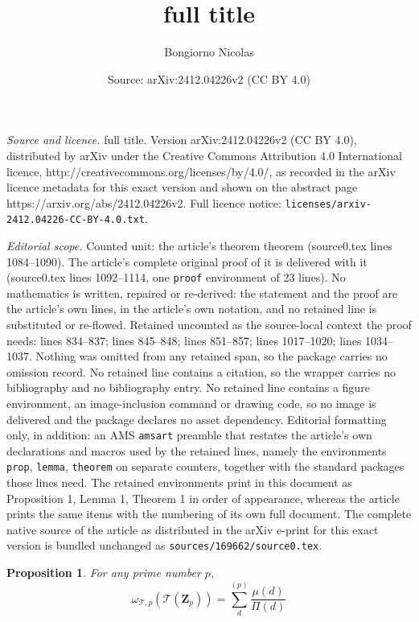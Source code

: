 \documentclass[10pt,a4paper]{amsart}
\title{full title}
\author{Bongiorno Nicolas}
\date{Source: arXiv:2412.04226v2 (CC BY 4.0)}
\newtheorem{prop}{Proposition}
\newcommand{\Z}{\mathbf{Z}}
\newcommand{\stackT}{\mathcal{T}}
\newcommand{\w}{\omega}
\begin{document}
\maketitle

\noindent\emph{Source and licence.} full title. Version arXiv:2412.04226v2 (CC BY 4.0), distributed by arXiv under the Creative Commons Attribution 4.0 International licence, http://creativecommons.org/licenses/by/4.0/, as recorded in the arXiv licence metadata for this exact version and shown on the abstract page https://arxiv.org/abs/2412.04226v2. Full licence notice: \texttt{licenses/arxiv-2412.04226-CC-BY-4.0.txt}.\par\smallskip

\noindent\textit{Editorial scope.} Counted unit: the article's theorem theorem (source0.tex lines 1084--1090). The article's complete original proof of it is delivered with it (source0.tex lines 1092--1114, one \texttt{proof} environment of 23 lines). No mathematics is written, repaired or re-derived: the statement and the proof are the article's own lines, in the article's own notation, and no retained line is substituted or re-flowed.  Retained uncounted as the source-local context the proof needs: lines 834--837; lines 845--848; lines 851--857; lines 1017--1020; lines 1034--1037.  Nothing was omitted from any retained span, so the package carries no omission record.  No retained line contains a citation, so the wrapper carries no bibliography and no bibliography entry.  No retained line contains a figure environment, an image-inclusion command or drawing code, so no image is delivered and the package declares no asset dependency.  Editorial formatting only, in addition: an AMS \texttt{amsart} preamble that restates the article's own declarations and macros used by the retained lines, namely the environments \texttt{prop}, \texttt{lemma}, \texttt{theorem} on separate counters, together with the standard packages those lines need.  The retained environments print in this document as Proposition 1, Lemma 1, Theorem 1 in order of appearance, whereas the article prints the same items with the numbering of its own full document.  The complete native source of the article as distributed in the arXiv e-print for this exact version is bundled unchanged as \texttt{sources/169662/source0.tex}.
\begin{prop}\label{value_local_mesure_mobius_function}
For any prime number $p$,
    $$\w_{\stackT,p}(\stackT(\Z_p)) =  \sum\limits_{d}^{(p)} \frac{\mu(d)}{\Pi(d)}$$
\end{prop}
\end{document}
